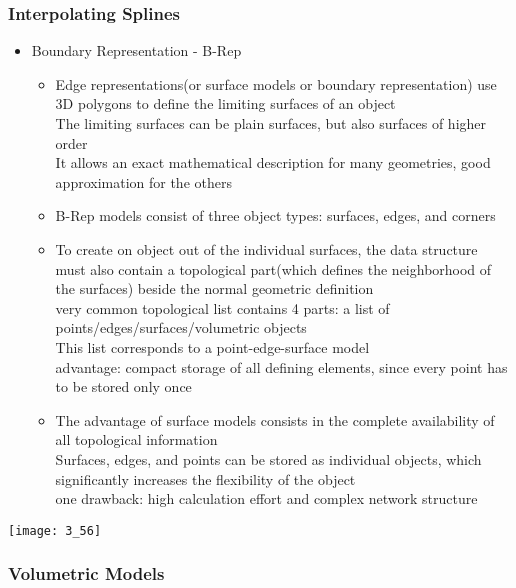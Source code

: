 \documentclass{standalone}
\begin{document}
\subsubsection*{Interpolating Splines}

\begin{itemize}
	\item Boundary Representation - B-Rep
	\begin{itemize}
		\item Edge representations(or surface models or boundary representation) use 3D polygons to define the limiting surfaces of an object \\
		The limiting surfaces can be plain surfaces, but also surfaces of higher order \\
		It allows an exact mathematical description for many geometries, good approximation for the others
		\item B-Rep models consist of three object types: surfaces, edges, and corners
		\item To create on object out of the individual surfaces, the data structure must also contain a topological part(which defines the neighborhood of the surfaces) beside the normal geometric definition \\
		very common topological list contains 4 parts: a list of points/edges/surfaces/volumetric objects \\
		This list corresponds to a point-edge-surface model \\
		advantage: compact storage of all defining elements, since every point has to be stored only once
		\item The advantage of surface models consists in the complete availability of all topological information \\
		Surfaces, edges, and points can be stored as individual objects, which significantly increases the flexibility of the object \\
		one drawback: high calculation effort and complex network structure
	\end{itemize}
\end{itemize}

\texttt{[image: 3\_56]}

\subsubsection*{Volumetric Models}
\end{document}
